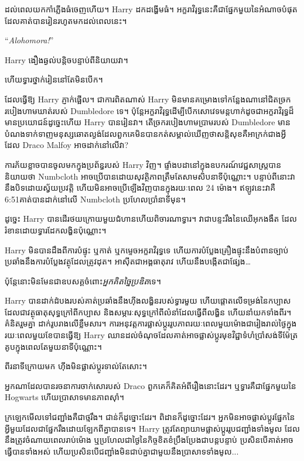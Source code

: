 {{{{{{ដល់ពេលយកកាំភ្លើងធំចេញហើយ។ Harry ដកដង្ហើមធំ។ អក្ខរាវិរុទ្ធនេះគឺជាផ្នែកមួយនៃអំណាចបំផុតដែលគាត់បានរៀនរហូតមកដល់ពេលនេះ។

“\emph{Alohomora!}”

Harry ងឿងឆ្ងល់បន្តិចបន្ទាប់ពីនិយាយវា។

ហើយទ្វារថ្នាក់រៀននៅតែមិនបើក។

ដែលធ្វើឱ្យ Harry ភ្ញាក់ផ្អើល។ ជាការពិតណាស់ Harry មិនមានគម្រោងទៅកន្លែងណានៅជិតច្រករបៀងហាមឃាត់របស់ Dumbledore ទេ។ ប៉ុន្តែអក្ខរាវិរុទ្ធដើម្បីបើកសោវេទមន្តហាក់ដូចជាអក្ខរាវិរុទ្ធដ៏មានប្រយោជន៍ដូច្នេះហើយ Harry បានរៀនវា។ តើច្រករបៀងហាមប្រាមរបស់ Dumbledore មានបំណងទាក់ទាញមនុស្សឆោតល្ងង់ដែលពួកគេមិនបានកត់សម្គាល់ឃើញថាសន្តិសុខគឺអាក្រក់ជាងអ្វីដែល Draco Malfoy អាចដាក់នៅលើវា?

ការភ័យខ្លាច​បាន​ចូល​មក​ក្នុង​ប្រព័ន្ធ​របស់ Harry វិញ។ ផ្ទាំងបដានៅក្នុងឧបករណ៍វេជ្ជសាស្ត្របាននិយាយថា Numbcloth អាចប្រើបានដោយសុវត្ថិភាពត្រឹមតែសាមសិបនាទីប៉ុណ្ណោះ។ បន្ទាប់ពីនោះវានឹងបិទដោយស្វ័យប្រវត្តិ ហើយមិនអាចប្រើឡើងវិញបានក្នុងរយៈពេល 24 ម៉ោង។ ឥឡូវនេះវាគឺ 6:51\pm គាត់បានដាក់នៅលើ Numbcloth ប្រហែលប្រាំនាទីមុន។

ដូច្នេះ Harry បានដើរថយក្រោយមួយជំហានហើយពិចារណាទ្វារ។ វា​ជា​បន្ទះ​រឹង​នៃ​ឈើ​អុក​ងងឹត ដែល​រំខាន​ដោយ​ទ្វារ​ដែក​លង្ហិន​ប៉ុណ្ណោះ។

Harry មិន​បាន​ដឹង​ពី​ការ​បំផ្ទុះ ឬ​កាត់ ឬ​កម្ទេច​អក្ខរាវិរុទ្ធ​ទេ ហើយ​ការ​បំប្លែង​គ្រឿង​ផ្ទុះ​នឹង​បំពាន​ច្បាប់​ប្រឆាំង​នឹង​ការ​បំប្លែង​វត្ថុ​ដែល​ត្រូវ​ដុត។ អាស៊ីត​ជា​អង្គធាតុ​រាវ ហើយ​នឹង​បង្កើត​ជា​ផ្សែង…

ប៉ុន្តែនោះមិនមែនជាឧបសគ្គចំពោះ\emph{អ្នកគិតច្នៃប្រឌិត}ទេ។

Harry បានដាក់ដំបងរបស់គាត់ប្រឆាំងនឹងហ៊ីងលង្ហិនរបស់ទ្វារមួយ ហើយផ្តោតលើទម្រង់នៃកប្បាសដែលជាវត្ថុធាតុសុទ្ធក្រៅពីកប្បាស និងសម្ភារៈសុទ្ធក្រៅពីលំនាំដែលធ្វើពីលង្ហិន ហើយនាំយកទាំងពីរ។ គំនិតរួមគ្នា ដាក់រូបរាងលើខ្លឹមសារ។ ការ​អនុវត្ត​ការ​ផ្លាស់​ប្តូរ​រូប​ភាព​រយៈពេល​មួយ​ម៉ោង​ជា​រៀង​រាល់​ថ្ងៃ​ក្នុង​រយៈ​ពេល​មួយ​ខែ​បាន​ធ្វើ​ឱ្យ Harry ឈាន​ដល់​ចំណុច​ដែល​គាត់​អាច​ផ្លាស់​ប្តូរ​មុខ​វិជ្ជា​ទំហំ​ប្រាំ​សង់ទីម៉ែត្រ​គូប​ក្នុង​ពេល​តែ​មួយ​នាទី​ប៉ុណ្ណោះ។

ពីរនាទីក្រោយមក ហ៊ីងមិនផ្លាស់ប្តូរទាល់តែសោះ។

អ្នក​ណា​ដែល​បាន​រចនា​ការ​ចាក់សោ​របស់ Draco ពួកគេ​ក៏​គិត​អំពី​រឿង​នោះ​ដែរ។ ឬទ្វារគឺជាផ្នែកមួយនៃ Hogwarts ហើយប្រាសាទមានភាពស៊ាំ។

ក្រឡេកមើលទៅជញ្ជាំងគឺជាថ្មរឹង។ ជាន់ក៏ដូច្នោះដែរ។ ពិដានក៏ដូច្នោះដែរ។ អ្នក​មិន​អាច​ផ្លាស់​ប្តូរ​ផ្នែក​នៃ​អ្វី​មួយ​ដែល​ជា​ផ្នែក​រឹង​ដោយ​ឡែក​ពី​គ្នា​បាន​ទេ។ Harry ត្រូវតែព្យាយាមផ្លាស់ប្តូររូបជញ្ជាំងទាំងមូល ដែលនឹងត្រូវចំណាយពេលរាប់ម៉ោង ឬប្រហែលជាថ្ងៃនៃកិច្ចខិតខំប្រឹងប្រែងជាបន្តបន្ទាប់ ប្រសិនបើគាត់អាចធ្វើបានទាំងអស់ ហើយប្រសិនបើជញ្ជាំងមិនជាប់គ្នាជាមួយនឹងប្រាសាទទាំងមូល...

}}}}}}
